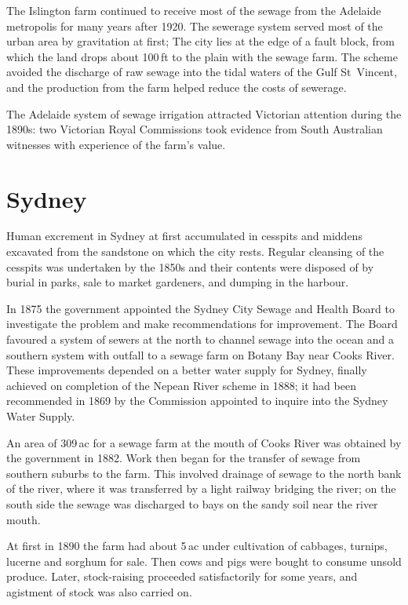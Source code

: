 The Islington farm continued to receive most of the sewage from the
Adelaide metropolis for many years after 1920.  The sewerage system
served most of the urban area by gravitation at first; The city lies
at the edge of a fault block, from which the land drops about 100\,ft
to the plain with the sewage farm.  The scheme avoided the discharge
of raw sewage into the tidal waters of the Gulf St~Vincent, and the
production from the farm helped reduce the costs of sewerage.

The Adelaide system of sewage irrigation attracted Victorian attention
during the 1890s: two Victorian Royal Commissions took evidence from
South Australian witnesses with experience of the farm's
value.

\section*{Sydney}

Human excrement in Sydney at first accumulated in cesspits and middens
excavated from the sandstone on which the city rests.  Regular
cleansing of the cesspits was undertaken by the 1850s and their
contents were disposed of by burial in parks, sale to market
gardeners, and dumping in the harbour.

In 1875 the government appointed the Sydney City Sewage and Health
Board to investigate the problem and make recommendations for
improvement.  The Board favoured a system of sewers at the north to
channel sewage into the ocean and a southern system with outfall to a
sewage farm on Botany Bay near Cooks River.  These improvements
depended on a better water supply for Sydney, finally achieved on
completion of the Nepean River scheme in 1888; it had been recommended
in 1869 by the Commission appointed to inquire into the Sydney Water
Supply.

An area of 309\,ac for a sewage farm at the mouth of Cooks River was
obtained by the government in 1882.  Work then began for the transfer
of sewage from southern suburbs to the farm.  This involved drainage
of sewage to the north bank of the river, where it was transferred by
a light railway bridging the river; on the south side the sewage was
discharged to bays on the sandy soil near the river mouth.

At first in 1890 the farm had about 5\,ac under cultivation of
cabbages, turnips, lucerne and sorghum for sale.  Then cows and pigs
were bought to consume unsold produce.  Later, stock-raising proceeded
satisfactorily for some years, and agistment of stock was also carried
on.

